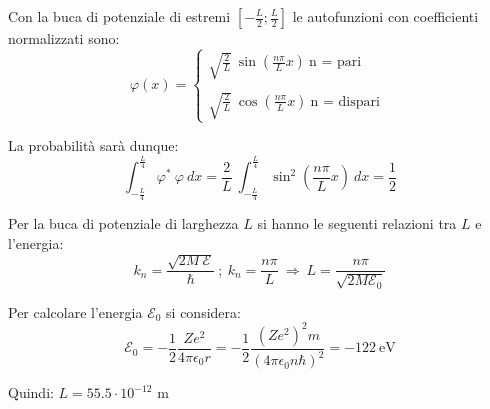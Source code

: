 \documentclass[12pt,twoside,a4]{article}
\begin{document}
\begin{solution}
Con la buca di potenziale di estremi $\left[- \frac{L}{2} ; \frac{L}{2}\right]$ le autofunzioni con coefficienti normalizzati sono: \begin{equation*}
 \varphi(x) = \begin{cases}
 \sqrt{\frac{2}{L}} \ \sin{\left(\frac{n \pi }{L} x \right)}  \  \text{n = pari } \\
 \\
 \sqrt{\frac{2}{L}} \ \cos{\left(\frac{n \pi }{L} x \right)}  \  \text{n = dispari }
 \end{cases}   
\end{equation*}
 
 \medskip
 La probabilità sarà dunque: 
 \begin{equation*}
 \int_{-\frac{L}{4}}^{\frac{L}{4}} {\varphi^\ast \ \varphi} \ dx = \frac{2}{L} \  \int_{-\frac{L}{4}}^{\frac{L}{4}} {\sin^2{\left(\frac{n \pi}{L} x \right)}} \ dx  = \frac{1}{2}  
 \end{equation*}
 \end{solution}
 
 
\begin{solution}
Per la buca di potenziale di larghezza $L$ si hanno le seguenti relazioni tra $L$ e l'energia: 
\begin{equation*}
 k_n = \frac{\sqrt{2 M \ \mathcal{E}}}{\hbar} \ ;  \  k_n =  \frac{n \pi}{L}   \  \Rightarrow  \  L = \frac{n \pi}{\sqrt{2 M \mathcal{E}_0}}  
\end{equation*}
 
 \medskip
 Per calcolare l'energia $\mathcal{E}_0$ si considera: \begin{equation*}
\mathcal{E}_0 = - \frac{1 }{2} \frac{Z e^2}{4 \pi \epsilon_0 r} = - \frac{1 }{2} \frac{(Z e^2)^2 m }{(4 \pi \epsilon_0 n \hbar)^2}  = -122 \ \mathrm{eV}   
 \end{equation*}
 
 Quindi: $L = 55.5 \cdot 10^{-12}$ m
\end{solution}
\end{document}
